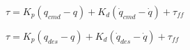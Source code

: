 \documentclass{article}
\begin{document}
$ \tau = K_p (q_{cmd} - q) + K_d (\dot{q}_{cmd} - \dot{q}) + \tau_{ff} $
\pagebreak

$ \tau = K_p (q_{des} - q) + K_d (\dot{q}_{des} - \dot{q}) + \tau_{ff} $
\pagebreak
\end{document}
